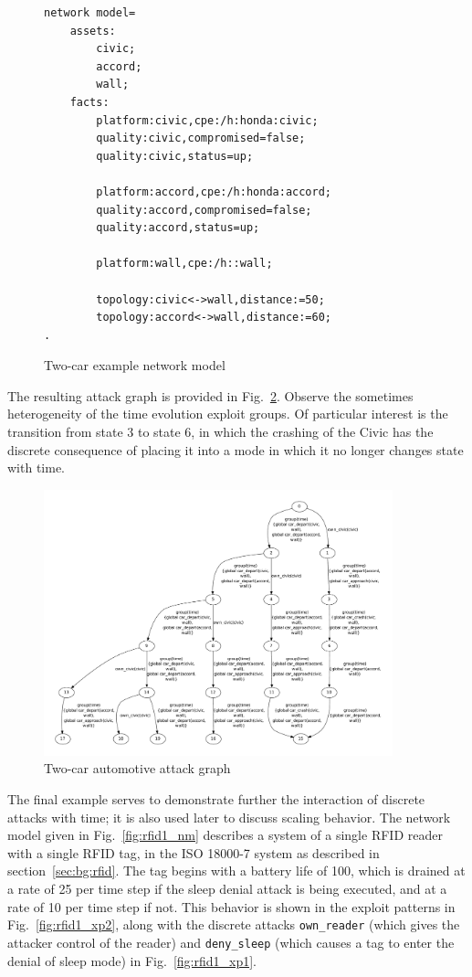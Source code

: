 \begin{figure}
\begin{lstlisting}
network model=
    assets:
        civic;
        accord;
        wall;
    facts:
        platform:civic,cpe:/h:honda:civic;
        quality:civic,compromised=false;
        quality:civic,status=up;
        
        platform:accord,cpe:/h:honda:accord;
        quality:accord,compromised=false;
        quality:accord,status=up;

        platform:wall,cpe:/h::wall;

        topology:civic<->wall,distance:=50;
        topology:accord<->wall,distance:=60;
.
\end{lstlisting}
\caption{Two-car example network model}
\label{fig:fullbunny_two_nm}
\end{figure}

The resulting attack graph is provided in Fig.~\ref{fig:fullbunny_two_ag}.
Observe the sometimes heterogeneity of the time evolution exploit groups.
Of particular interest is the transition from state 3 to state 6, in which
the crashing of the Civic has the discrete consequence of placing it into a
mode in which it no longer changes state with time.

\begin{figure}
\includegraphics[angle=90,width=0.9\textwidth]{ag_car/twocar/full_bunny_twocar_ag_5}
\caption{Two-car automotive attack graph}
\label{fig:fullbunny_two_ag}
\end{figure}
\label{sec:rfid}
The final example serves to demonstrate further the interaction of discrete
attacks with time; it is also used later to discuss scaling behavior. The network
model given in Fig.~\ref{fig:rfid1_nm} describes a system of a single
RFID reader with a single RFID tag, in the ISO 18000-7 system as described 
in section~\ref{sec:bg:rfid}. The tag begins with a battery life of 100, which
is drained at a rate of 25 per time step if the sleep denial attack is being
executed, and at a rate of 10 per time step if not. This behavior is shown in
the exploit patterns in Fig.~\ref{fig:rfid1_xp2}, along with
the discrete attacks \texttt{own\_reader} (which gives the attacker control of
the reader) and \texttt{deny\_sleep} (which causes a tag to enter the
denial of sleep mode) in Fig.~\ref{fig:rfid1_xp1}.

